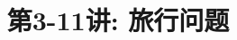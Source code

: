 \documentclass[a4paper, justified]{tufte-handout}
\title{第3-11讲: 旅行问题}
\date{\zhtoday} %
\begin{document}
\maketitle
\noplagiarism %
\begin{abstract}
\end{abstract}
\beginrequired

\begin{problem}[CZ 6.4]
\end{problem}
\end{document}
